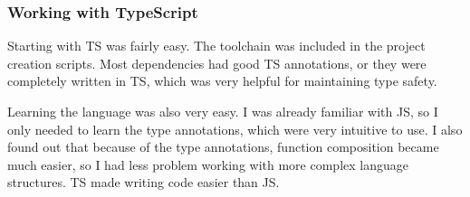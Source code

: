 \subsubsection{Working with TypeScript}\label{sec:working-with-typescript}

Starting with \acl{TS} was fairly easy.
The toolchain was included in the project creation scripts.
Most dependencies had good \acl{TS} annotations,
or they were completely written in \acl{TS},
which was very helpful for maintaining type safety.

Learning the language was also very easy.
I was already familiar with \acl{JS},
so I only needed to learn the type annotations,
which were very intuitive to use.
I also found out that because of the type annotations,
function composition became much easier,
so I had less problem working with more complex
language structures.
\Acl{TS} made writing code easier than \acl{JS}.
